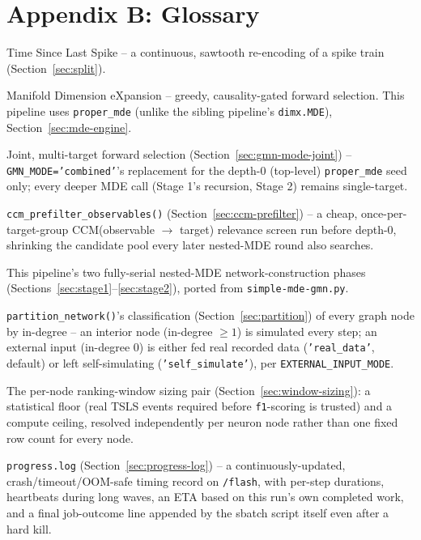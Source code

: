 \documentclass[11pt]{article}
\begin{document}
\newpage
\section*{Appendix B: Glossary}
\begin{description}[leftmargin=3.2cm, style=nextline]
  \item[TSLS] Time Since Last Spike -- a continuous, sawtooth re-encoding of a spike train (Section~\ref{sec:split}).
  \item[MDE] Manifold Dimension eXpansion -- greedy, causality-gated forward selection. This pipeline uses \texttt{proper\_mde} (unlike the sibling pipeline's \texttt{dimx.MDE}), Section~\ref{sec:mde-engine}.
  \item[\texttt{multi\_proper\_mde}] Joint, multi-target forward selection (Section~\ref{sec:gmn-mode-joint}) -- \texttt{GMN\_MODE='combined'}'s replacement for the depth-0 (top-level) \texttt{proper\_mde} seed only; every deeper MDE call (Stage 1's recursion, Stage 2) remains single-target.
  \item[CCM pre-filter] \texttt{ccm\_prefilter\_observables()} (Section~\ref{sec:ccm-prefilter}) -- a cheap, once-per-target-group CCM(observable $\to$ target) relevance screen run before depth-0, shrinking the candidate pool every later nested-MDE round also searches.
  \item[Stage 1 / Stage 2] This pipeline's two fully-serial nested-MDE network-construction phases (Sections~\ref{sec:stage1}--\ref{sec:stage2}), ported from \texttt{simple-mde-gmn.py}.
  \item[External input / interior node] \texttt{partition\_network()}'s classification (Section~\ref{sec:partition}) of every graph node by in-degree -- an interior node (in-degree $\ge 1$) is simulated every step; an external input (in-degree 0) is either fed real recorded data (\texttt{'real\_data'}, default) or left self-simulating (\texttt{'self\_simulate'}), per \texttt{EXTERNAL\_INPUT\_MODE}.
  \item[\texttt{MIN\_PRED\_EVENTS} / \texttt{MAX\_WINDOW\_ROWS}] The per-node ranking-window sizing pair (Section~\ref{sec:window-sizing}): a statistical floor (real TSLS events required before \texttt{f1}-scoring is trusted) and a compute ceiling, resolved independently per neuron node rather than one fixed row count for every node.
  \item[Progress log] \texttt{progress.log} (Section~\ref{sec:progress-log}) -- a continuously-updated, crash/timeout/OOM-safe timing record on \texttt{/flash}, with per-step durations, heartbeats during long waves, an ETA based on this run's own completed work, and a final job-outcome line appended by the sbatch script itself even after a hard kill.

\end{description}
\end{document}
